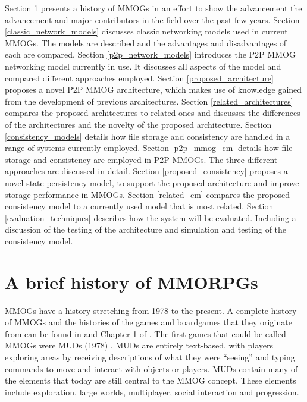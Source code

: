 \documentclass[journal,oneside,a4paper,onecolumn]{IEEEtran}
\begin{document}
Section \ref{mmog_history} presents a history of MMOGs in an effort to show the advancement the advancement and major contributors in the field over the past few years.
%
Section \ref{classic_network_models} discusses classic networking models used in current MMOGs. The models are described and the advantages and disadvantages of each are compared.
%
Section \ref{p2p_network_models} introduces the P2P MMOG networking model currently in use. It discusses all aspects of the model and compared different approaches employed.
%
Section \ref{proposed_architecture} proposes a novel P2P MMOG architecture, which makes use of knowledge gained from the development of previous architectures.
%
Section \ref{related_architectures} compares the proposed architectures to related ones and discusses the differences of the architectures and the novelty of the proposed architecture.
%
Section \ref{consistency_models} details how file storage and consistency are handled in a range of systems currently employed.
%
Section \ref{p2p_mmog_cm} details how file storage and consistency are employed in P2P MMOGs. The three different approaches are discussed in detail.
%
Section \ref{proposed_consistency} proposes a novel state persistency model, to support the proposed architecture and improve storage performance in MMOGs.
%
Section \ref{related_cm} compares the proposed consistency model to a currently used model that is most related.
%
Section \ref{evaluation_techniques} describes how the system will be evaluated. Including a discussion of the testing of the architecture and simulation and testing of the consistency model.
%



\section{A brief history of MMORPGs}
\label{mmog_history}

\acp{MMOG} have a history stretching from 1978 to the present. A complete history of \acp{MMOG} and the histories of the games and boardgames that they originate from can be found in \cite{mmog_past_present_future} and Chapter 1 of \cite{designing_virtual_worlds}. The first games that could be called \acp{MMOG} were \acp{MUD} (1978) \cite{mud_intro}. \acp{MUD} are entirely text-based, with players exploring areas by receiving descriptions of what they were ``seeing'' and typing commands to move and interact with objects or players. \acp{MUD} contain many of the elements that today are still central to the \ac{MMOG} concept. These elements include exploration, large worlds, multiplayer, social interaction and progression.
\end{document}
